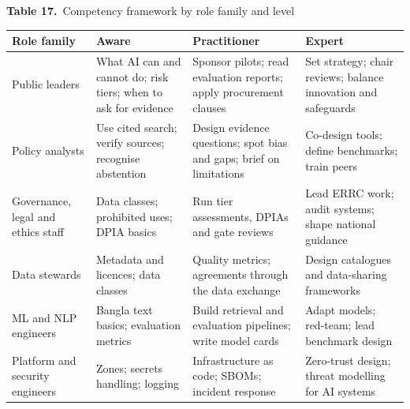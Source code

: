 \documentclass[border=10pt]{standalone}
\begin{document}
\begin{minipage}{17cm}
{\large\bfseries Table 17.}\ {\large Competency framework by role family and level}\par\vspace{7pt}
\small
{}
\begin{tabularx}{\linewidth}{@{}>{\hsize=0.870\hsize\raggedright\arraybackslash}X>{\hsize=1.043\hsize\raggedright\arraybackslash}X>{\hsize=1.043\hsize\raggedright\arraybackslash}X>{\hsize=1.043\hsize\raggedright\arraybackslash}X@{}}
\arrayrulecolor{bapilrule}\toprule
\rowcolor{white}\textbf{Role family} & \textbf{Aware} & \textbf{Practitioner} & \textbf{Expert} \\
\midrule
Public leaders & What AI can and cannot do; risk tiers; when to ask for evidence & Sponsor pilots; read evaluation reports; apply procurement clauses & Set strategy; chair reviews; balance innovation and safeguards \\
Policy analysts & Use cited search; verify sources; recognise abstention & Design evidence questions; spot bias and gaps; brief on limitations & Co-design tools; define benchmarks; train peers \\
Governance, legal and ethics staff & Data classes; prohibited uses; DPIA basics & Run tier assessments, DPIAs and gate reviews & Lead ERRC work; audit systems; shape national guidance \\
Data stewards & Metadata and licences; data classes & Quality metrics; agreements through the data exchange & Design catalogues and data-sharing frameworks \\
ML and NLP engineers & Bangla text basics; evaluation metrics & Build retrieval and evaluation pipelines; write model cards & Adapt models; red-team; lead benchmark design \\
Platform and security engineers & Zones; secrets handling; logging & Infrastructure as code; SBOMs; incident response & Zero-trust design; threat modelling for AI systems \\
\bottomrule
\end{tabularx}
\par{}
\end{minipage}
\end{document}
